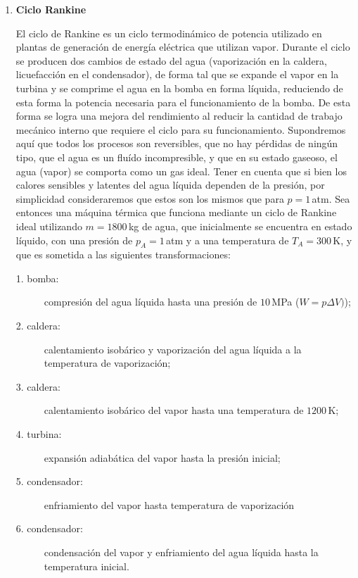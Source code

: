 \documentclass[a4paper,12pt]{article}
\begin{document}
\begin{enumerate}
	\item {\bf{Ciclo Rankine}}

		El ciclo de Rankine es un ciclo termodinámico de potencia utilizado en
		plantas de generación de energía eléctrica que utilizan vapor. Durante
		el ciclo se producen dos cambios de estado del agua (vaporización en la
		caldera, licuefacción en el condensador), de forma tal que se expande
		el vapor en la turbina y se comprime el agua en la bomba en forma
		líquida, reduciendo de esta forma la potencia necesaria para el
		funcionamiento de la bomba. De esta forma se logra una mejora del
		rendimiento al reducir la cantidad de trabajo mecánico interno que
		requiere el ciclo para su funcionamiento. Supondremos aquí que todos
		los procesos son reversibles, que no hay pérdidas de ningún tipo, que
		el agua es un fluído incompresible, y que en su estado gaseoso, el agua
		(vapor) se comporta como un gas ideal. Tener en cuenta que si bien los
		calores sensibles y latentes del agua líquida dependen de la presión,
		por simplicidad consideraremos que estos son los mismos que para
		$p=1$\,atm. Sea entonces una máquina térmica que funciona mediante un
		ciclo de Rankine ideal utilizando $m=1800$\,kg de agua, que
		inicialmente se encuentra en estado líquido, con una presión de
		$p_A=1$\,atm y a una temperatura de $T_A=300$\,K, y que es sometida a
		las siguientes transformaciones: 

		\begin{description}
			\item[1. bomba:]compresión del agua líquida hasta una presión de
				$10$\,MPa ($W=p\Delta V)$);
			\item[2. caldera:] calentamiento isobárico y vaporización del agua
				líquida a la temperatura de vaporización;
			\item[3. caldera:] calentamiento isobárico del vapor hasta una
				temperatura de $1200$\,K;
			\item[4. turbina:] expansión adiabática del vapor hasta la presión
				inicial;
			\item[5. condensador:] enfriamiento del vapor hasta temperatura de
				vaporización
			\item[6. condensador:] condensación del vapor y enfriamiento del
				agua líquida hasta la temperatura inicial. 
		\end{description}
		

\end{enumerate}
\end{document}
